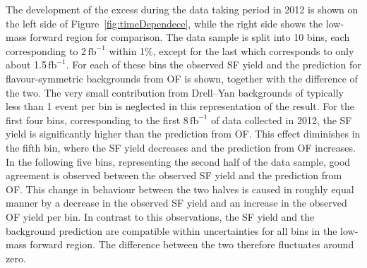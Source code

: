 The development of the excess during the data taking period in 2012 is shown on the left side of Figure~\ref{fig:timeDependece}, while the right side shows the low-mass forward region for comparison. The data sample is split into 10 bins, each corresponding to 2\,$\mathrm{fb}^{-1}$ within 1\%, except for the last which corresponds to only  about 1.5\,$\mathrm{fb}^{-1}$. For each of these bins the observed SF yield and the prediction for flavour-symmetric backgrounds from OF is shown, together with the difference of the two. The very small contribution from Drell--Yan backgrounds of typically less than 1 event per bin is neglected in this representation of the result. For the first four bins, corresponding to the first 8\,$\mathrm{fb}^{-1}$ of data collected in 2012, the SF yield is significantly higher than the prediction from OF. This effect diminishes in the fifth bin, where the SF yield decreases and the prediction from OF increases. In the following five bins, representing the second half of the data sample, good agreement is observed between the observed SF yield and the prediction from OF. This change in behaviour between the two halves is caused in roughly equal manner by a decrease in the observed SF yield and an increase in the observed OF yield per bin. In contrast to this observations, the SF yield and the background prediction are compatible within uncertainties for all bins in the low-mass forward region. The difference between the two therefore fluctuates around zero.

